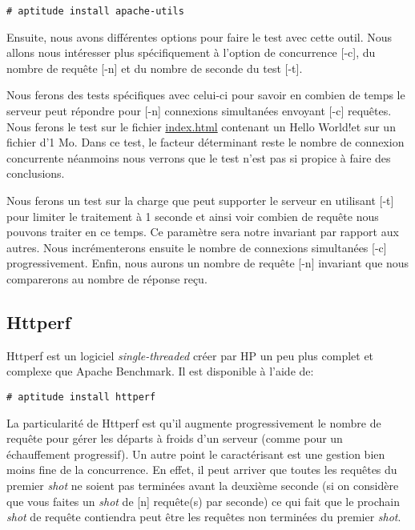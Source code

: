 \documentclass[a4paper, 11pt]{article}
\begin{document}
\begin{lstlisting}
# aptitude install apache-utils
\end{lstlisting}

Ensuite,  nous avons  différentes options pour  faire le test  avec cette outil.
Nous allons nous intéresser plus  spécifiquement à l'option de concurrence [-c],
du nombre de requête [-n] et du nombre de seconde du test [-t].

Nous ferons des tests spécifiques avec  celui-ci pour savoir en combien de temps
le  serveur  peut  répondre  pour  [-n]  connexions  simultanées  envoyant  [-c]
requêtes.  Nous ferons le  test  sur  le  fichier  \url{index.html} contenant un
\guillemotleft Hello  World!\guillemotright et sur  un fichier d'1  Mo.  Dans ce
test,  le facteur déterminant reste le nombre de connexion concurrente néanmoins
nous verrons que le test n'est pas si propice à faire des conclusions.

Nous ferons  un test sur  la charge que  peut supporter le  serveur en utilisant
[-t] pour  limiter le traitement  à 1 seconde  et ainsi voir  combien de requête
nous pouvons traiter en ce temps.  Ce paramètre sera notre invariant par rapport
aux  autres.  Nous incrémenterons  ensuite le  nombre de  connexions simultanées
[-c] progressivement.  Enfin,  nous  aurons un nombre de  requête [-n] invariant
que nous comparerons au nombre de réponse reçu.

\subsection{Httperf}

Httperf est un logiciel \emph{single-threaded} créer  par HP un peu plus complet
et complexe que Apache Benchmark. Il est disponible à l'aide de:

\begin{lstlisting}
# aptitude install httperf
\end{lstlisting}

La  particularité de  Httperf est  qu'il augmente  progressivement le  nombre de
requête  pour  gérer   les  départs  à  froids  d'un   serveur  (comme  pour  un
échauffement progressif).  Un autre point le  caractérisant est une gestion bien
moins fine de la concurrence.  En effet, il peut arriver que toutes les requêtes
du premier \emph{shot} ne soient pas  terminées avant la deuxième seconde (si on
considère que vous  faites un \emph{shot} de [n] requête(s)  par seconde) ce qui
fait que  le prochain \emph{shot} de  requête contiendra peut  être les requêtes
non terminées du premier \emph{shot}.
\end{document}
